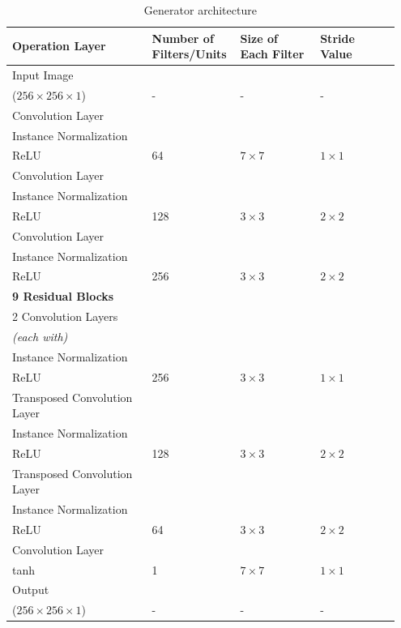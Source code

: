 \begin{table}[H]
    \centering

    \begin{tabular}{P{0.35\linewidth} P{0.20\linewidth} P{0.20\linewidth} P{0.20\linewidth}} 
        \toprule
        \textbf{Operation Layer} & \textbf{Number of Filters/Units} & \textbf{Size of Each Filter} & \textbf{Stride Value}\\
        \toprule
        \toprule
        Input Image \\($256 \times 256 \times 1$) & - & - & - \\
        \midrule
        Convolution Layer\\Instance Normalization\\\ac{ReLU} & 64 & $7 \times 7$ & $1 \times 1$\\
        \midrule
        Convolution Layer\\Instance Normalization\\\ac{ReLU} & 128 & $3 \times 3$ & $2 \times 2$\\
        \midrule
        Convolution Layer\\Instance Normalization\\\ac{ReLU} & 256 & $3 \times 3$ & $2 \times 2$\\
        \midrule
        \textbf{9 Residual Blocks}\\
	  2 Convolution Layers\\ \textit{(each with)}\\Instance Normalization\\\ac{ReLU} & 256 & $3 \times 3$ & $1 \times 1$\\
        \midrule
        Transposed Convolution Layer\\Instance Normalization\\\ac{ReLU} & 128 & $3 \times 3$ & $2 \times 2$\\
        \midrule
        Transposed Convolution Layer\\Instance Normalization\\\ac{ReLU} & 64 & $3 \times 3$ & $2 \times 2$\\
        \midrule
         Convolution Layer\\tanh & 1 & $7 \times 7$ & $1 \times 1$\\
        \midrule
        \midrule
        Output  \\($256 \times 256 \times 1$) & - & - & -\\
        \bottomrule
    \end{tabular}
    \caption[Generator architecture]{Generator architecture}
    \label{table:GeneratorArchitecture}
\end{table}



